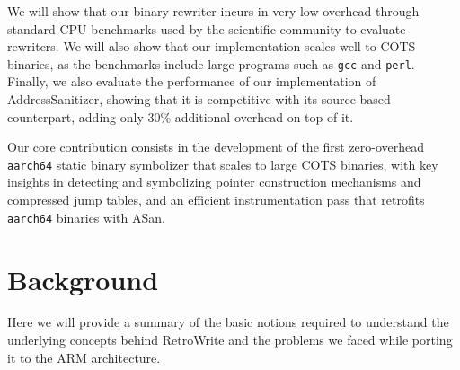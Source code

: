 \documentclass[a4paper,11pt,oneside]{report}
\newcommand{\sysname}{RetroWrite\xspace}
\begin{document}
We will show that our binary rewriter incurs in very low overhead through 
standard CPU benchmarks used by the scientific community to evaluate rewriters.  
We will also show that our implementation scales well to COTS binaries, as the 
benchmarks include large programs such as \texttt{gcc} and \texttt{perl}.  
Finally, we also evaluate the performance of our implementation of 
AddressSanitizer, showing that it is competitive with its source-based 
counterpart, adding only 30\% additional overhead on top of it. 

Our core contribution consists in the development of the first zero-overhead 
\texttt{aarch64} static binary symbolizer that scales to large COTS binaries, 
with key insights in detecting and symbolizing pointer construction mechanisms 
and compressed jump tables, and an efficient instrumentation pass that 
retrofits \texttt{aarch64} binaries with ASan.



\chapter{Background}

Here we will provide a summary of the basic notions required to understand the 
underlying concepts behind \sysname and the problems we faced while porting 
it to the ARM architecture. 
\end{document}
